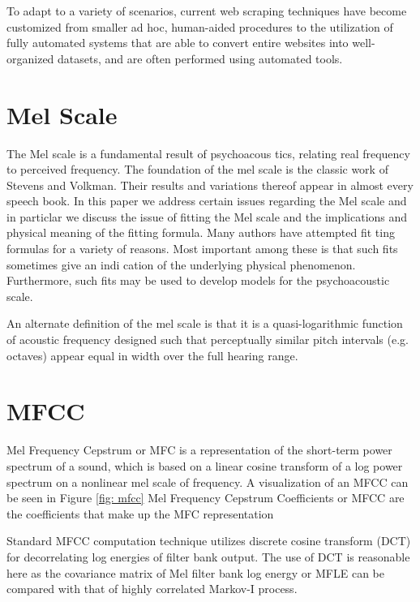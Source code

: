 To adapt to a variety of scenarios, current web scraping techniques have become customized from smaller ad hoc, human-aided procedures to the utilization of fully automated systems that are able to convert entire websites into well-organized datasets, and are often performed using automated tools.
\section{Mel Scale}
The Mel scale is a fundamental result of psychoacous tics, relating real frequency to perceived frequency. The foundation of the mel scale is the classic work of Stevens and Volkman\cite{mel-scale}. Their results and variations thereof appear in almost every speech book. In this paper we address certain issues regarding the Mel scale and in particlar we discuss the issue of fitting the Mel scale and the implications and physical meaning of the fitting formula. Many authors have attempted fit ting formulas for a variety of reasons. Most important among these is that such fits sometimes give an indi cation of the underlying physical phenomenon. Furthermore, such fits may be used to develop models for the psychoacoustic scale. \newline

An alternate definition of the mel scale is that it is a quasi-logarithmic function of acoustic frequency designed such that perceptually similar pitch intervals (e.g. octaves) appear equal in width over the full hearing range.

\section{MFCC}
Mel Frequency Cepstrum or MFC is a representation of the short-term power spectrum of a sound, which is based on a linear cosine transform of a log power spectrum on a nonlinear mel scale of frequency. A visualization of an MFCC can be seen in Figure \ref{fig: mfcc}
Mel Frequency Cepstrum Coefficients or MFCC are the coefficients that make up the MFC representation  \cite{mel-frequency_2021} \newline

Standard MFCC computation technique utilizes discrete cosine transform (DCT) for decorrelating log energies of filter bank output. The use of DCT is reasonable here as the covariance matrix of Mel filter bank log energy or MFLE can be compared with that of highly correlated Markov-I process.\cite{mfcc_speaker_2012}

